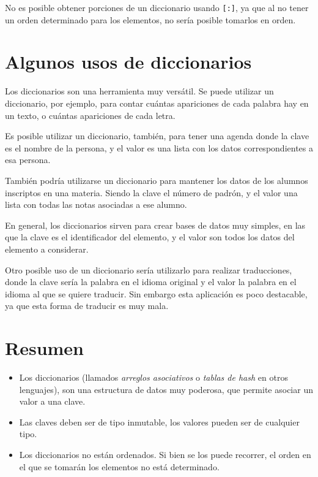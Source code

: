 No es posible obtener porciones de un diccionario usando \lstinline![:]!,
ya que al no tener un orden determinado para los elementos, no sería
posible tomarlos en orden.

\section{Algunos usos de diccionarios}

Los diccionarios son una herramienta muy versátil.  Se puede utilizar un
diccionario, por ejemplo, para contar cuántas apariciones de cada palabra
hay en un texto, o cuántas apariciones de cada letra.

Es posible utilizar un diccionario, también, para tener una agenda donde la
clave es el nombre de la persona, y el valor es una lista con los datos
correspondientes a esa persona.

También podría utilizarse un diccionario para mantener los datos de los
alumnos inscriptos en una materia.  Siendo la clave el número de padrón, y
el valor una lista con todas las notas asociadas a ese alumno.

En general, los diccionarios sirven para crear bases de datos muy simples,
en las que la clave es el identificador del elemento, y el valor son todos
los datos del elemento a considerar.

Otro posible uso de un diccionario sería utilizarlo para realizar
traducciones, donde la clave sería la palabra en el idioma original y el
valor la palabra en el idioma al que se quiere traducir.  Sin embargo esta
aplicación es poco destacable, ya que esta forma de traducir es muy mala.

\section{Resumen}

\begin{itemize}
\item Los diccionarios (llamados {\it arreglos asociativos} o {\it tablas
de hash} en otros lenguajes), son una estructura de datos muy poderosa, que permite
asociar un valor a una clave.
\item Las claves deben ser de tipo inmutable, los valores
pueden ser de cualquier tipo.
\item Los diccionarios no están ordenados.  Si bien se los puede recorrer,
el orden en el que se tomarán los elementos no está determinado.
\end{itemize}

